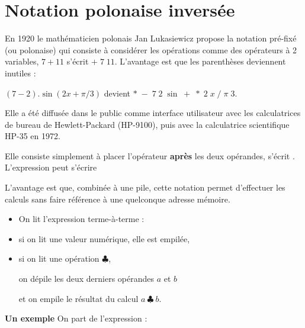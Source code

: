 \section{Notation polonaise inversée}
En 1920 le mathématicien polonais Jan Lukasiewicz propose la notation pré-fixé (ou polonaise) qui consiste à considérer les opérations comme des opérateurs à 2 variables, $7 + 11$ s'écrit $+\; 7\; 11$. L'avantage est que les parenthèses deviennent inutiles :


 $(7-2).\sin(2x+\pi/3)$ devient
$*\; -\; 7\; 2\; \sin \; +\; *\; 2\; x\; /\; \pi\; 3$.

Elle a été diffusée dans le public comme interface utilisateur avec les calculatrices de bureau de Hewlett-Packard (HP-9100), puis avec la calculatrice scientifique HP-35 en 1972.

Elle consiste simplement à placer l'opérateur {\bf après} les deux opérandes,  s'écrit . L'expression  peut s'écrire

L'avantage est que, combinée à une pile, cette notation permet d'effectuer les calculs sans faire référence à une quelconque adresse mémoire. 

\begin{itemize}
\item On lit l'expression terme-à-terme :

\item si on lit une valeur numérique, elle est empilée, 

\item si on lit une opération $\clubsuit$, 

on dépile les deux derniers opérandes $a$ et $b$ 

et on empile le résultat du calcul $a\ \clubsuit\ b$.
\end{itemize}	
{\bf Un exemple}
On part de l'expression  :

